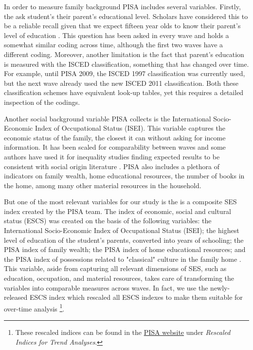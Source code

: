 \documentclass[11pt, a4paper]{article}\usepackage[]{graphicx}\usepackage[]{color}
\begin{document}
In order to measure family background PISA includes several variables. Firstly, the ask student's their parent's educational level. Scholars have considered this to be a reliable recall given that we expect fifteen year olds to know their parent's level of education \citep{reardon2011}. This question has been asked in every wave and holds a somewhat similar coding across time, although the first two waves have a different coding. Moreover, another limitation is the fact that parent's education is measured with the ISCED classification, something that has changed over time. For example, until PISA 2009, the ISCED 1997 classification was currently used, but the next wave already used the new ISCED 2011 classification. Both these classification schemes have equivalent look-up tables, yet this requires a detailed inspection of the codings.

Another social background variable PISA collects is the International Socio-Economic Index of Occupational Status (ISEI). This variable captures the economic status of the family, the closest it can without asking for income information. It has been scaled for comparability between waves and some authors have used it for inequality studies finding expected results to be consistent with social origin literature \citep{anna2016_global}. PISA also includes a plethora of indicators on family wealth, home educational resources, the number of books in the home, among many other material resources in the household.

But one of the most relevant variables for our study is the is a composite SES index created by the PISA team. The index of economic, social and cultural status (ESCS) was created on the basis of the following variables: the International Socio-Economic Index of Occupational Status (ISEI); the highest level of education of the student’s parents, converted into years of schooling; the PISA index of family wealth; the PISA index of home educational resources; and the PISA index of possessions related to "classical" culture in the family home \citep{oecd_glance_2002}. This variable, aside from capturing all relevant dimensions of SES, such as education, occupation, and material resources, takes care of transforming the variables into comparable measures across waves. In fact, we use the newly-released ESCS index \citep{pisa_2015_results} which rescaled all ESCS indexes to make them suitable for over-time analysis \footnote{These rescaled indices can be found in the \href{http://www.oecd.org/pisa/data/2015database/}{PISA website} under \emph{Rescaled Indices for Trend Analyses}.}.
\end{document}
